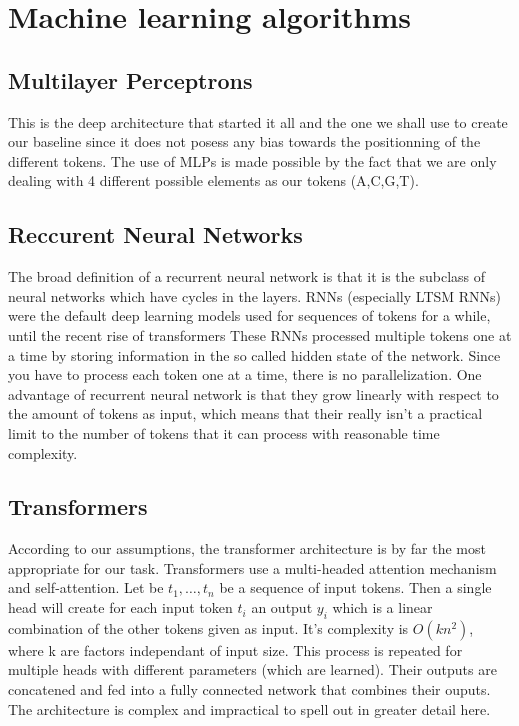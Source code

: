 \documentclass{article}
\begin{document}
\section{Machine learning algorithms}
\subsection*{Multilayer Perceptrons}
This is the deep architecture that started it all 
and the one we shall use to create our baseline since it does 
not posess any bias towards the positionning of 
the different tokens. The use of MLPs is made possible by the fact 
that we are only dealing with 4 different possible elements as our tokens
(A,C,G,T).

\subsection{Reccurent Neural Networks}
The broad definition of a recurrent neural network 
is that it is the subclass of neural networks \cite{lstms} which have cycles in the layers. 
RNNs (especially LTSM RNNs) were the default deep learning models used for sequences
of tokens for a while, until the recent rise of transformers 
These RNNs processed multiple tokens one at a time by storing information in the so called
hidden state of the network. Since you have to process each token one at 
a time, there is no parallelization. 
One advantage of recurrent neural network is that they grow 
linearly with respect to the amount of tokens as input, which means 
that their really isn't a practical limit to the number of tokens that
it can process with reasonable time complexity. 
\subsection{Transformers}
According to our assumptions, the transformer 
architecture \cite{transformers} is by far the most appropriate
for our task. Transformers use a multi-headed 
attention mechanism and self-attention. Let
be $t_1, \dots, t_n$ be a sequence of input tokens. Then a single 
head will create for each input token $t_i$ an output $y_i$ which is a 
linear combination of the other tokens given as input. It's complexity
is $O(kn^2)$, where k are factors independant of input size. This process is 
repeated for multiple heads with different parameters (which are learned). Their
outputs are concatened and fed into a fully connected network that combines 
their ouputs. The architecture is complex and impractical to spell out
in greater detail here.
\end{document}
